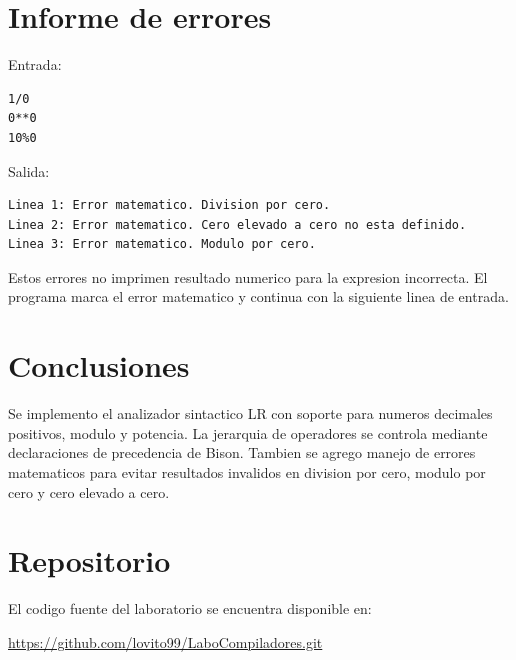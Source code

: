 \documentclass[12pt,a4paper]{article}
\begin{document}
\section{Informe de errores}

Entrada:

\begin{lstlisting}
1/0
0**0
10%0
\end{lstlisting}

Salida:

\begin{lstlisting}
Linea 1: Error matematico. Division por cero.
Linea 2: Error matematico. Cero elevado a cero no esta definido.
Linea 3: Error matematico. Modulo por cero.
\end{lstlisting}

Estos errores no imprimen resultado numerico para la expresion incorrecta. El programa marca el error matematico y continua con la siguiente linea de entrada.

\section{Conclusiones}

Se implemento el analizador sintactico LR con soporte para numeros decimales positivos, modulo y potencia. La jerarquia de operadores se controla mediante declaraciones de precedencia de Bison. Tambien se agrego manejo de errores matematicos para evitar resultados invalidos en division por cero, modulo por cero y cero elevado a cero.

\section{Repositorio}

El codigo fuente del laboratorio se encuentra disponible en:

\begin{center}
\url{https://github.com/lovito99/LaboCompiladores.git}
\end{center}
\end{document}
